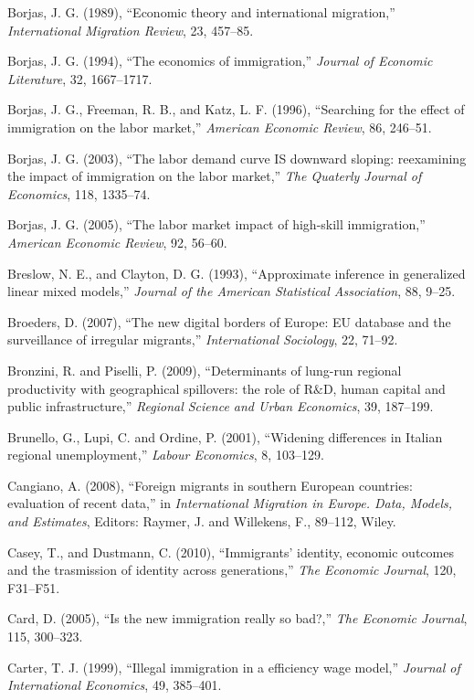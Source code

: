 \documentclass[10pt]{article}
\theoremstyle{definition}
\theoremstyle{plain}
\begin{document}
\begin{thebibliography}{99}
\bibitem{} Borjas, J. G. (1989), ``Economic theory and international migration,'' \textit{International Migration Review}, 23, 457--85.

\bibitem{} Borjas, J. G. (1994), ``The economics of immigration,'' \textit{Journal of Economic Literature}, 32, 1667--1717.

\bibitem{} Borjas, J. G., Freeman, R. B., and Katz, L. F. (1996), ``Searching for the effect of immigration on the labor market,'' \textit{American Economic Review}, 86, 246--51.

\bibitem{} Borjas, J. G. (2003), ``The labor demand curve IS downward sloping: reexamining the impact of immigration on the labor market,'' \textit{The Quaterly Journal of Economics}, 118, 1335--74.

\bibitem{} Borjas, J. G. (2005), ``The labor market impact of high-skill immigration,'' \textit{American Economic Review}, 92, 56--60.

\bibitem{} Breslow, N. E., and Clayton, D. G. (1993), ``Approximate inference in generalized linear mixed models,'' \textit{Journal of the American Statistical Association}, 88, 9--25.

\bibitem{} Broeders, D. (2007), ``The new digital borders of Europe: EU database and the surveillance of irregular migrants,'' \textit{International Sociology}, 22, 71--92.

\bibitem{} Bronzini, R. and Piselli, P. (2009), ``Determinants of lung-run regional productivity with geographical spillovers: the role of R$\&$D, human capital and public infrastructure,'' \textit{Regional Science and Urban Economics}, 39, 187--199.

\bibitem{} Brunello, G., Lupi, C. and Ordine, P. (2001), ``Widening differences in Italian regional unemployment,'' \textit{Labour Economics}, 8, 103--129.

\bibitem{} Cangiano, A. (2008), ``Foreign migrants in southern European countries: evaluation of recent data,'' in \textit{International Migration in Europe. Data, Models, and Estimates}, Editors: Raymer, J. and Willekens, F., 89--112, Wiley.

\bibitem{} Casey, T., and Dustmann, C. (2010), ``Immigrants' identity, economic outcomes and the trasmission of identity across generations,'' \textit{The Economic Journal}, 120, F31--F51.

\bibitem{} Card, D. (2005), ``Is the new immigration really so bad?,'' \textit{The Economic Journal}, 115, 300--323.

\bibitem{} Carter, T. J. (1999), ``Illegal immigration in a efficiency wage model,'' \textit{Journal of International Economics}, 49, 385--401.


\end{thebibliography}
\end{document}
